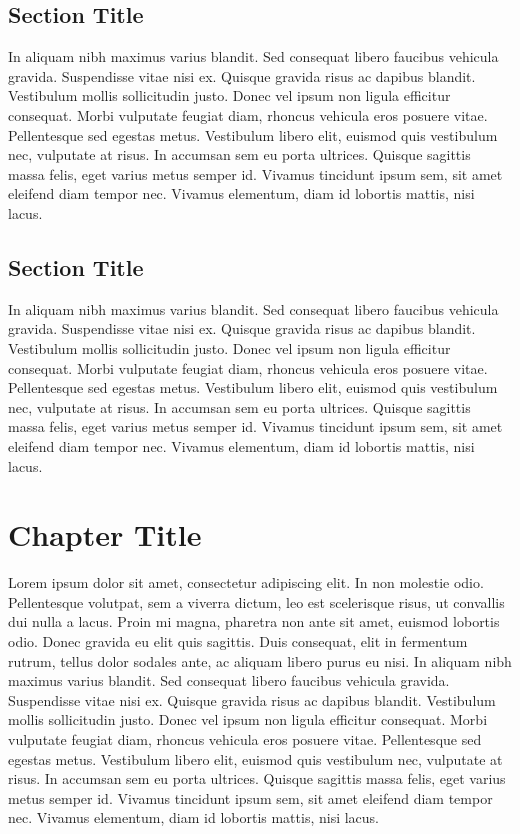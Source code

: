 \documentclass[12pt]{report}
\begin{document}
\section{Section Title}
In aliquam nibh maximus varius blandit. Sed consequat libero faucibus vehicula gravida. Suspendisse vitae nisi ex. Quisque gravida risus ac dapibus blandit. Vestibulum mollis sollicitudin justo. Donec vel ipsum non ligula efficitur consequat. Morbi vulputate feugiat diam, rhoncus vehicula eros posuere vitae. Pellentesque sed egestas metus. Vestibulum libero elit, euismod quis vestibulum nec, vulputate at risus. In accumsan sem eu porta ultrices. Quisque sagittis massa felis, eget varius metus semper id. Vivamus tincidunt ipsum sem, sit amet eleifend diam tempor nec. Vivamus elementum, diam id lobortis mattis, nisi lacus.


\section{Section Title}
In aliquam nibh maximus varius blandit. Sed consequat libero faucibus vehicula gravida. Suspendisse vitae nisi ex. Quisque gravida risus ac dapibus blandit. Vestibulum mollis sollicitudin justo. Donec vel ipsum non ligula efficitur consequat. Morbi vulputate feugiat diam, rhoncus vehicula eros posuere vitae. Pellentesque sed egestas metus. Vestibulum libero elit, euismod quis vestibulum nec, vulputate at risus. In accumsan sem eu porta ultrices. Quisque sagittis massa felis, eget varius metus semper id. Vivamus tincidunt ipsum sem, sit amet eleifend diam tempor nec. Vivamus elementum, diam id lobortis mattis, nisi lacus.


\chapter{Chapter Title}

Lorem ipsum dolor sit amet, consectetur adipiscing elit. In non molestie odio. Pellentesque volutpat, sem a viverra dictum, leo est scelerisque risus, ut convallis dui nulla a lacus. Proin mi magna, pharetra non ante sit amet, euismod lobortis odio. Donec gravida eu elit quis sagittis. Duis consequat, elit in fermentum rutrum, tellus dolor sodales ante, ac aliquam libero purus eu nisi. In aliquam nibh maximus varius blandit. Sed consequat libero faucibus vehicula gravida. Suspendisse vitae nisi ex. Quisque gravida risus ac dapibus blandit. Vestibulum mollis sollicitudin justo. Donec vel ipsum non ligula efficitur consequat. Morbi vulputate feugiat diam, rhoncus vehicula eros posuere vitae. Pellentesque sed egestas metus. Vestibulum libero elit, euismod quis vestibulum nec, vulputate at risus. In accumsan sem eu porta ultrices. Quisque sagittis massa felis, eget varius metus semper id. Vivamus tincidunt ipsum sem, sit amet eleifend diam tempor nec. Vivamus elementum, diam id lobortis mattis, nisi lacus.
\end{document}
